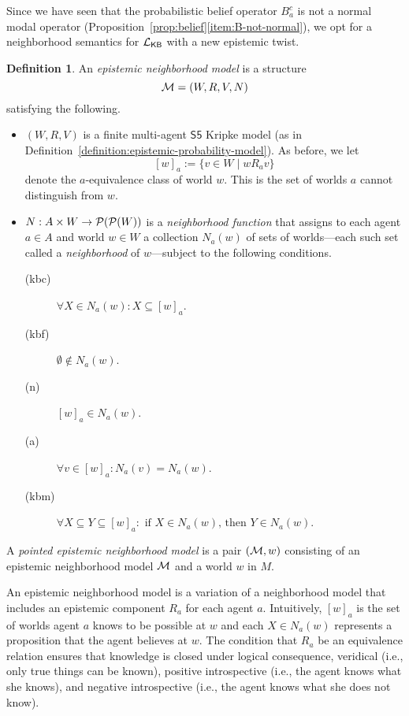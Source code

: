 \documentclass[12pt]{article}
\theoremstyle{definition}
\newtheorem{definition}[theorem]{Definition}
\newcommand{\pow}{{\cal P}}    %
\newcommand{\M}{{\cal M}}      %
\newcommand{\Lang}{{\cal L}}   %
\newcommand{\KB}{{\mathsf{KB}}}                        %
\begin{document}
Since we have seen that the probabilistic belief operator $B_a^c$ is
not a normal modal operator (Proposition~\ref{prop:belief}\eqref{item:B-not-normal}), we opt
for a neighborhood semantics for $\Lang_\KB$ \cite[Ch.~7]{Chellas:ml}
with a new epistemic twist.

\begin{definition} 
  An \emph{epistemic neighborhood model} is a structure
  \[
  \M=(W,R,V,N)
  \]
  satisfying the following.
  \begin{itemize}
  \item $(W,R,V)$ is a finite multi-agent $\mathsf{S5}$ Kripke model
    (as in Definition~\ref{definition:epistemic-probability-model}).
    As before, we let 
    \[
    [w]_a:=\{v\in W\mid wR_av\}
    \]
    denote the $a$-equivalence class of world $w$.  This is the
    set of worlds $a$ cannot distinguish from $w$.

  \item $N : A\times W \to \pow(\pow(W))$ is a \emph{neighborhood
      function} that assigns to each agent $a\in A$ and world $w\in W$
    a collection $N_a(w)$ of sets of worlds---each such set called a
    \emph{neighborhood} of $w$---subject to the following conditions.
    \begin{description}
    \item[(kbc)] $\forall X \in N_a(w) : X \subseteq [w]_a$.

    \item[(kbf)] $\emptyset\notin N_a(w)$.
      
    \item[(n)] $[w]_a\in N_a(w)$.
      
    \item[(a)] $\forall v \in [w]_a : N_a(v) = N_a(w)$.

    \item[(kbm)] $\forall X \subseteq Y \subseteq [w]_a : 
      \text{ if } X \in N_a(w) \text{, then } Y \in N_a(w)$.
   \end{description}
  \end{itemize}
  A \emph{pointed epistemic neighborhood model} is a pair $(\M,w)$
  consisting of an epistemic neighborhood model $\M$ and a world $w$
  in $M$. 
\end{definition}

An epistemic neighborhood model is a variation of a neighborhood model that
includes an epistemic component $R_a$ for each agent $a$.
Intuitively, $[w]_a$ is the set of worlds agent $a$ knows to be
possible at $w$ and each $X\in N_a(w)$ represents a proposition that
the agent believes at $w$.  The condition that $R_a$ be an equivalence
relation ensures that knowledge is closed under logical consequence,
veridical (i.e., only true things can be known), positive
introspective (i.e., the agent knows what she knows), and negative
introspective (i.e., the agent knows what she does not know).
\end{document}

